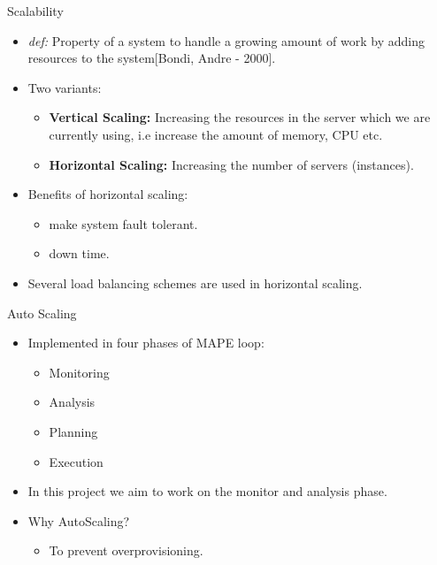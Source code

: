 \documentclass{beamer}
\begin{document}
\begin{frame}{Scalability}
    \begin{itemize}
        \pause
        \item \textit{def:} Property of a system to handle a growing amount of work by adding resources
            to the system[Bondi, Andre - 2000].
        \pause
        \item Two variants:
            \begin{itemize}
                \pause
                \item \textbf{Vertical Scaling:} Increasing the resources in the
                        server which we are currently using, i.e increase the amount of memory, CPU etc.
                \pause
                \item \textbf{Horizontal Scaling:} Increasing the number of servers (instances).
            \end{itemize}
        \pause
        \item Benefits of horizontal scaling:
            \begin{itemize}
                \pause
                \item make system fault tolerant.
                \pause
                \item down time.
            \end{itemize}
        \pause
        \item Several load balancing schemes are used in horizontal scaling.
    \end{itemize}
\end{frame}


\begin{frame}{Auto Scaling}
\begin{itemize}
    \pause
    \item Implemented in four phases of MAPE loop:
        \begin{itemize}
            \pause
            \item Monitoring
            \pause\item Analysis
            \pause\item Planning
            \pause\item Execution
        \end{itemize}
    \pause\item In this project we aim to work on the monitor and analysis phase.
    \pause\item Why AutoScaling?
        \begin{itemize}
            \pause\item To prevent overprovisioning.
        \end{itemize}
\end{itemize}
\end{frame}
\end{document}
